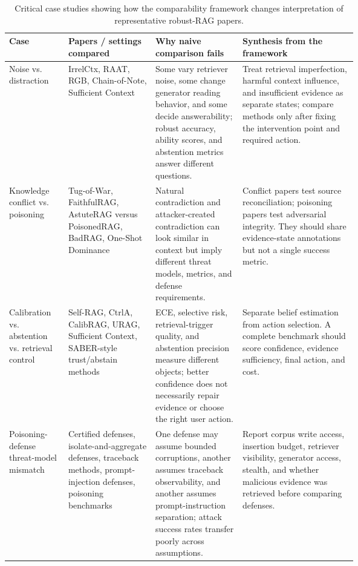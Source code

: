 \begin{table}[t]
\centering
\scriptsize
\renewcommand{\arraystretch}{0.9}
\begin{tabularx}{\linewidth}{>{\raggedright\arraybackslash}p{0.17\linewidth}>{\raggedright\arraybackslash}p{0.25\linewidth}>{\raggedright\arraybackslash}p{0.25\linewidth}X}
\toprule
\textbf{Case} & \textbf{Papers / settings compared} & \textbf{Why naive comparison fails} & \textbf{Synthesis from the framework} \\
\midrule
Noise vs. distraction & IrrelCtx, RAAT, RGB, Chain-of-Note, Sufficient Context & Some vary retriever noise, some change generator reading behavior, and some decide answerability; robust accuracy, ability scores, and abstention metrics answer different questions. & Treat retrieval imperfection, harmful context influence, and insufficient evidence as separate states; compare methods only after fixing the intervention point and required action. \\
Knowledge conflict vs. poisoning & Tug-of-War, FaithfulRAG, AstuteRAG versus PoisonedRAG, BadRAG, One-Shot Dominance & Natural contradiction and attacker-created contradiction can look similar in context but imply different threat models, metrics, and defense requirements. & Conflict papers test source reconciliation; poisoning papers test adversarial integrity. They should share evidence-state annotations but not a single success metric. \\
Calibration vs. abstention vs. retrieval control & Self-RAG, CtrlA, CalibRAG, URAG, Sufficient Context, SABER-style trust/abstain methods & ECE, selective risk, retrieval-trigger quality, and abstention precision measure different objects; better confidence does not necessarily repair evidence or choose the right user action. & Separate belief estimation from action selection. A complete benchmark should score confidence, evidence sufficiency, final action, and cost. \\
Poisoning-defense threat-model mismatch & Certified defenses, isolate-and-aggregate defenses, traceback methods, prompt-injection defenses, poisoning benchmarks & One defense may assume bounded corruptions, another assumes traceback observability, and another assumes prompt-instruction separation; attack success rates transfer poorly across assumptions. & Report corpus write access, insertion budget, retriever visibility, generator access, stealth, and whether malicious evidence was retrieved before comparing defenses. \\
\bottomrule
\end{tabularx}
\caption{Critical case studies showing how the comparability framework changes interpretation of representative robust-RAG papers.}
\label{tab:critical-case-studies}
\end{table}

